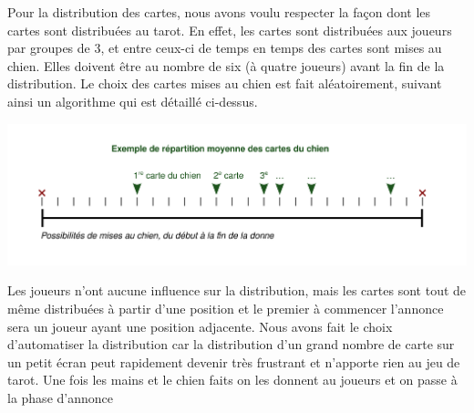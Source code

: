 \documentclass[a4paper]{report}
\begin{document}
				\newpage
				Pour la distribution des cartes, nous avons voulu respecter la façon dont les cartes sont distribuées au tarot. En effet, les cartes sont distribuées aux joueurs par 					groupes de 3, et entre ceux-ci de temps en temps des cartes sont mises au chien. Elles doivent être au nombre de six (à quatre joueurs) avant la fin de la distribution.
				Le choix des cartes mises au chien est fait aléatoirement, suivant ainsi un algorithme qui est détaillé ci-dessus.
				\begin{center}
					\includegraphics[scale=0.9]{Images/rep.png}
				\end{center}
				Les joueurs n’ont aucune influence sur la distribution, mais les cartes sont tout de même distribuées à partir d’une position et le premier à commencer l’annonce sera un 					joueur ayant une position adjacente.
				Nous avons fait le choix d’automatiser la distribution car la distribution d’un grand nombre de carte sur un petit écran peut rapidement devenir très frustrant et 					n’apporte rien au jeu de tarot. Une fois les mains et le chien faits on les donnent au joueurs et on passe à la phase d’annonce
\end{document}
